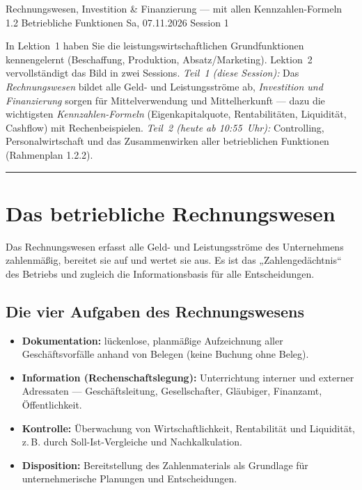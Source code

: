 \documentclass[11pt, a4paper]{article}
\begin{document}
%
  {Rechnungswesen, Investition \& Finanzierung --- mit allen Kennzahlen-Formeln}%
  {1.2 Betriebliche Funktionen}%
  {Sa, 07.11.2026 \textperiodcentered{} Session 1}

\begin{merksatz}[title={\bfseries Worum geht es in dieser Session?}]
In Lektion~1 haben Sie die leistungswirtschaftlichen Grundfunktionen kennengelernt
(Beschaffung, Produktion, Absatz/Marketing). Lektion~2 vervollständigt das Bild in zwei
Sessions. \emph{Teil~1 (diese Session):} Das \emph{Rechnungswesen} bildet alle Geld- und
Leistungsströme ab, \emph{Investition und Finanzierung} sorgen für Mittelverwendung und
Mittelherkunft --- dazu die wichtigsten \emph{Kennzahlen-Formeln} (Eigenkapitalquote,
Rentabilitäten, Liquidität, Cashflow) mit Rechenbeispielen. \emph{Teil~2 (heute ab
10:55~Uhr):} Controlling, Personalwirtschaft und das Zusammenwirken aller betrieblichen
Funktionen (Rahmenplan 1.2.2).
\end{merksatz}

\tableofcontents
\vspace{1em}
\hrule
\vspace{1em}

\section{Das betriebliche Rechnungswesen}

Das Rechnungswesen erfasst alle Geld- und Leistungsströme des Unternehmens zahlenmäßig,
bereitet sie auf und wertet sie aus. Es ist das „Zahlengedächtnis`` des Betriebs und
zugleich die Informationsbasis für alle Entscheidungen.

\subsection{Die vier Aufgaben des Rechnungswesens}

\begin{itemize}
  \item \textbf{Dokumentation:} lückenlose, planmäßige Aufzeichnung aller
    Geschäftsvorfälle anhand von Belegen (keine Buchung ohne Beleg).
  \item \textbf{Information (Rechenschaftslegung):} Unterrichtung interner und externer
    Adressaten --- Geschäftsleitung, Gesellschafter, Gläubiger, Finanzamt, Öffentlichkeit.
  \item \textbf{Kontrolle:} Überwachung von Wirtschaftlichkeit, Rentabilität und
    Liquidität, z.\,B. durch Soll-Ist-Vergleiche und Nachkalkulation.
  \item \textbf{Disposition:} Bereitstellung des Zahlenmaterials als Grundlage für
    unternehmerische Planungen und Entscheidungen.
\end{itemize}
\end{document}
